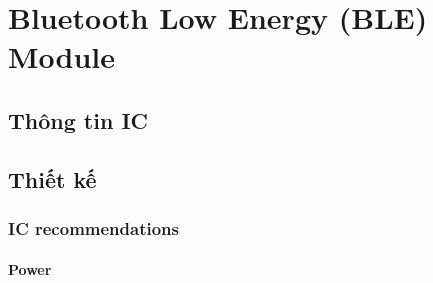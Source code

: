     \section{Bluetooth Low Energy (BLE) Module}
        \subsection{Thông tin IC}
        \subsection{Thiết kế}
            \subsubsection{IC recommendations}
                \paragraph{Power}
